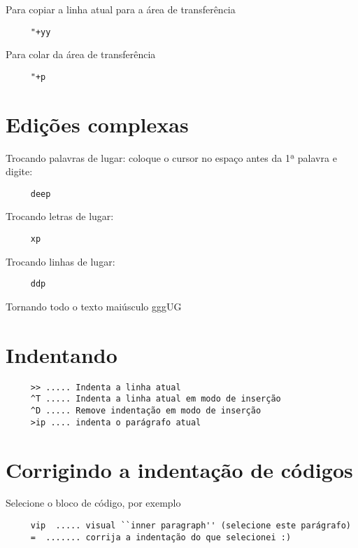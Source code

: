 Para copiar a linha atual para a área de transferência

\begin{verbatim}
     "+yy
\end{verbatim}

Para colar da área de transferência

\begin{verbatim}
     "+p
\end{verbatim}

\section{Edições complexas }
\label{Edições complexas }

Trocando palavras de lugar: coloque o cursor no espaço antes da 1ª palavra e digite:

\begin{verbatim}
     deep
\end{verbatim}

Trocando letras de lugar:

\begin{verbatim}
     xp
\end{verbatim}

Trocando linhas de lugar:

\begin{verbatim}
     ddp
\end{verbatim}

Tornando todo o texto maiúsculo
 gggUG

\section{Indentando }

\begin{verbatim}
     >> ..... Indenta a linha atual
     ^T ..... Indenta a linha atual em modo de inserção
     ^D ..... Remove indentação em modo de inserção
     >ip .... indenta o parágrafo atual
\end{verbatim}

\section{Corrigindo a indentação de códigos}
\label{Corrigindo a indentação de códigos}
Selecione o bloco de código, por exemplo

\begin{verbatim}
     vip  ..... visual ``inner paragraph'' (selecione este parágrafo)
     =  ....... corrija a indentação do que selecionei :)
\end{verbatim}

